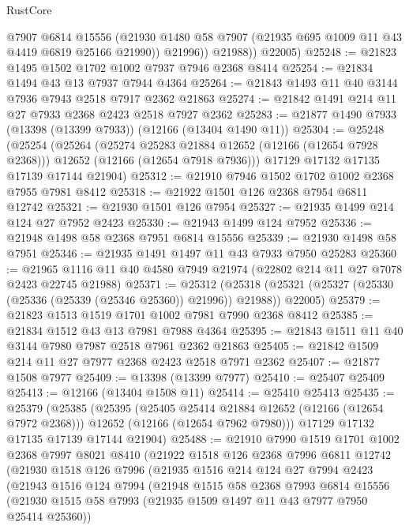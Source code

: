 \begin{lexlean}{RustCore}
\begin{coremodule}
              @7907
              @6814
              @15556
              (@21930 @1480 @58 @7907 (@21935 @695 @1009 @11 @43 @4419 @6819 @25166 @21990))
              @21996))
          @21988))
      @22005)
@25248 := @21823 @1495 @1502 @1702 @1002 @7937 @7946 @2368 @8414
@25254 := @21834 @1494 @43 @13 @7937 @7944 @4364
@25264 := @21843 @1493 @11 @40 @3144 @7936 @7943 @2518 @7917 @2362 @21863
@25274 := @21842 @1491 @214 @11 @27 @7933 @2368 @2423 @2518 @7927 @2362
@25283 := @21877 @1490 @7933 (@13398 (@13399 @7933)) (@12166 (@13404 @1490 @11))
@25304 := @25248
    (@25254
      (@25264
        (@25274 @25283 @21884 @12652 (@12166 (@12654 @7928 @2368)))
        @12652
        (@12166 (@12654 @7918 @7936)))
      @17129
      @17132
      @17135
      @17139
      @17144
      @21904)
@25312 := @21910 @7946 @1502 @1702 @1002 @2368 @7955 @7981 @8412
@25318 := @21922 @1501 @126 @2368 @7954 @6811 @12742
@25321 := @21930 @1501 @126 @7954
@25327 := @21935 @1499 @214 @124 @27 @7952 @2423
@25330 := @21943 @1499 @124 @7952
@25336 := @21948 @1498 @58 @2368 @7951 @6814 @15556
@25339 := @21930 @1498 @58 @7951
@25346 := @21935 @1491 @1497 @11 @43 @7933 @7950 @25283
@25360 := @21965 @1116 @11 @40 @4580 @7949 @21974 (@22802 @214 @11 @27 @7078 @2423 @22745 @21988)
@25371 := @25312
    (@25318 (@25321 (@25327 (@25330 (@25336 (@25339 (@25346 @25360)) @21996)) @21988)) @22005)
@25379 := @21823 @1513 @1519 @1701 @1002 @7981 @7990 @2368 @8412
@25385 := @21834 @1512 @43 @13 @7981 @7988 @4364
@25395 := @21843 @1511 @11 @40 @3144 @7980 @7987 @2518 @7961 @2362 @21863
@25405 := @21842 @1509 @214 @11 @27 @7977 @2368 @2423 @2518 @7971 @2362
@25407 := @21877 @1508 @7977
@25409 := @13398 (@13399 @7977)
@25410 := @25407 @25409
@25413 := @12166 (@13404 @1508 @11)
@25414 := @25410 @25413
@25435 := @25379
    (@25385
      (@25395
        (@25405 @25414 @21884 @12652 (@12166 (@12654 @7972 @2368)))
        @12652
        (@12166 (@12654 @7962 @7980)))
      @17129
      @17132
      @17135
      @17139
      @17144
      @21904)
@25488 := @21910
    @7990
    @1519
    @1701
    @1002
    @2368
    @7997
    @8021
    @8410
    (@21922
      @1518
      @126
      @2368
      @7996
      @6811
      @12742
      (@21930
        @1518
        @126
        @7996
        (@21935
          @1516
          @214
          @124
          @27
          @7994
          @2423
          (@21943
            @1516
            @124
            @7994
            (@21948
              @1515
              @58
              @2368
              @7993
              @6814
              @15556
              (@21930 @1515 @58 @7993 (@21935 @1509 @1497 @11 @43 @7977 @7950 @25414 @25360))

\end{coremodule}
\end{lexlean}
